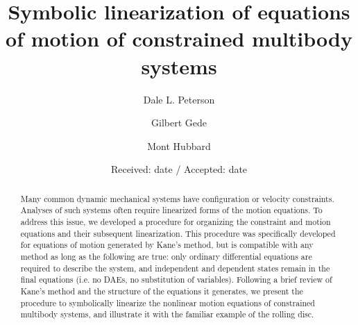 \documentclass[smallcondensed,final]{svjour3}                     %
\begin{document}
\title{Symbolic linearization of equations of motion of constrained multibody systems}


\author{Dale L. Peterson\and Gilbert Gede\and Mont Hubbard}


\date{Received: date / Accepted: date}

\maketitle

\begin{abstract}
Many common dynamic mechanical systems have configuration or velocity constraints.
Analyses of such systems often require linearized forms of the motion
equations.
To address this issue, we developed a procedure for organizing the constraint
and motion equations and their subsequent linearization.  This procedure was
specifically developed for equations of motion generated by Kane's method, but
is compatible with any method as long as the following are true: only ordinary
differential equations are required to describe the system, and independent and
dependent states remain in the final equations (i.e. no DAEs, no substitution
of variables).
Following a brief review of Kane's method and the structure of the equations it
generates, we present the procedure to symbolically linearize the nonlinear
motion equations of constrained multibody systems, and illustrate it with the
familiar example of the rolling disc.


\end{abstract}
\end{document}
